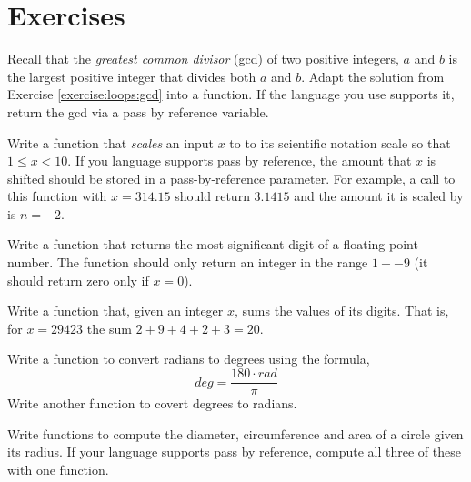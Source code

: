 

\section{Exercises}

\begin{exer}
\label{exercise:functions:gcd}
Recall that the \emph{greatest common divisor} (gcd) of two positive integers, 
$a$ and $b$ is the largest positive integer that divides both $a$ and
$b$.  Adapt the solution from Exercise \ref{exercise:loops:gcd} into
a function.  If the language you use supports it, return the gcd via
a pass by reference variable.
\end{exer}

\begin{exer}
Write a function that \emph{scales} an input $x$ to to its scientific
notation scale so that $1 \leq x < 10$.  If you language supports 
pass by reference, the amount that $x$ is shifted should be stored 
in a pass-by-reference parameter.  For example, a call to this function 
with $x = 314.15$ should return $3.1415$ and the amount it is scaled
by is $n=-2$.
\end{exer}

\begin{exer}
Write a function that returns the most significant digit of a floating
point number.  The function should only return an integer in the range 
$1--9$ (it should return zero only if $x = 0$).
\end{exer}

\begin{exer}
Write a function that, given an integer $x$, sums the values of
its digits.  That is, for $x = 29423$ the sum $2 + 9 + 4 + 2 + 3 = 20$.
\end{exer}

\begin{exer}
Write a function to convert radians to degrees using the formula,
  $$deg = \frac{180\cdot rad}{\pi}$$
Write another function to covert degrees to radians.
\end{exer}

\begin{exer}
\label{exercise:functions:circleStats}
Write functions to compute the diameter, circumference and
area of a circle given its radius.  If your language supports 
pass by reference, compute all three of these with one function.
\end{exer}


